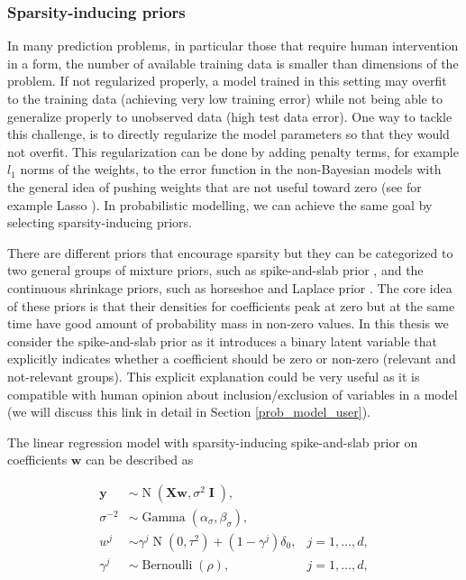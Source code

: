 \documentclass[dissertation,math,vertlayout,pdfa,colorlinks]{aaltoseries}
\newcommand{\bw}{\bm{w}}
\newcommand{\bX}{\bm{X}}
\newcommand{\by}{\bm{y}}
\DeclareMathOperator{\eye}{\textbf{I}}
\DeclareMathOperator{\bernoullipdf}{Bernoulli}
\DeclareMathOperator{\normalpdf}{N}
\DeclareMathOperator{\gammapdf}{Gamma}
\begin{document}
\subsubsection{Sparsity-inducing priors}

In many prediction problems, in particular those that require human intervention in a form, the number of available training data is smaller than dimensions of the problem. If not regularized properly, a model trained in this setting may overfit to the training data (achieving very low training error) while not being able to generalize properly to unobserved data (high test data error). One way to tackle this challenge, is to directly regularize the model parameters so that they would not overfit. This regularization can be done by adding penalty terms, for example $l_1$ norms of the weights, to the error function in the non-Bayesian models with the general idea of pushing weights that are not useful toward zero (see for example Lasso \cite{lasso2011}). In probabilistic modelling, we can achieve the same goal by selecting sparsity-inducing priors. 

There are different priors that encourage sparsity but they can be categorized to two general groups of mixture priors, such as spike-and-slab prior \cite{spike_slab1993}, and the continuous shrinkage priors, such as horseshoe \cite{horseshoe_2017} and Laplace prior \cite{seeger2008bayesian}. The core idea of these priors is that their densities for coefficients peak at zero but at the same time have good amount of probability mass in non-zero values. In this thesis we consider the spike-and-slab prior as it introduces a binary latent variable that explicitly indicates whether a coefficient should be zero or non-zero  (relevant and not-relevant groups). This explicit explanation could be very useful as it is compatible with human opinion about inclusion/exclusion of variables in a model (we will discuss this link in detail in Section \ref{prob_model_user}).

The linear regression model with sparsity-inducing spike-and-slab prior on coefficients $\bw$ can be described as

\begin{align}\label{Eq:ss_Bayesian_regression}
\by &\sim \normalpdf(\bX\bw,\sigma^2 \eye), \\
\sigma^{-2} &\sim \gammapdf(\alpha_{\sigma}, \beta_{\sigma}), \nonumber \\
w^j &\sim \gamma^j \normalpdf(0, \tau^2) + (1 - \gamma^j) \delta_0,  & j=1,\ldots,d, \nonumber\\
\gamma^j &\sim \bernoullipdf(\rho), & j=1,\ldots,d, \nonumber
\end{align}
\end{document}
